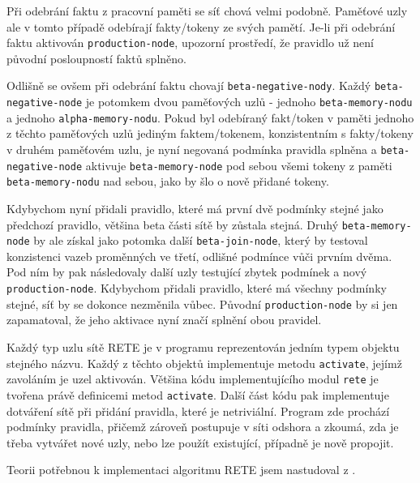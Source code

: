 Při odebrání faktu z pracovní paměti se síť chová velmi podobně. Paměťové uzly
ale v tomto případě odebírají fakty/tokeny ze svých pamětí.
Je-li při odebrání faktu aktivován \verb|production-node|, upozorní prostředí,
že pravidlo už není původní posloupností faktů splněno.

Odlišně se ovšem při odebrání faktu chovají \verb|beta-negative-nody|. Každý
\verb|beta-negative-node| je potomkem dvou paměťových uzlů - jednoho
\verb|beta-memory-nodu| a jednoho \verb|alpha-memory-nodu|. Pokud byl odebíraný
fakt/token v paměti jednoho z těchto paměťových uzlů jediným faktem/tokenem,
konzistentním s fakty/tokeny v druhém paměťovém uzlu, je nyní negovaná podmínka
pravidla splněna a \verb|beta-negative-node| aktivuje \verb|beta-memory-node|
pod sebou všemi tokeny z paměti \verb|beta-memory-nodu| nad sebou, jako by šlo o
nově přidané tokeny.

Kdybychom nyní přidali pravidlo, které má první dvě podmínky stejné jako
předchozí pravidlo, většina beta části sítě by zůstala stejná. Druhý
\verb|beta-memory-node| by ale získal jako potomka další \verb|beta-join-node|,
který by testoval konzistenci vazeb proměnných ve třetí, odlišné podmínce vůči
prvním dvěma. Pod ním by pak následovaly další uzly testující zbytek podmínek a
nový \verb|production-node|. Kdybychom přidali pravidlo, které má všechny
podmínky stejné, síť by se dokonce nezměnila vůbec. Původní
\verb|production-node| by si jen zapamatoval, že jeho aktivace nyní značí
splnění obou pravidel.

Každý typ uzlu sítě RETE je v programu reprezentován jedním typem objektu
stejného názvu. Každý z těchto objektů implementuje metodu \verb|activate|,
jejímž zavoláním je uzel aktivován. Většina kódu implementujícího modul
\verb|rete| je tvořena právě definicemi metod \verb|activate|. Další část kódu
pak implementuje dotváření sítě při přidání pravidla, které je netriviální.
Program zde prochází podmínky pravidla, přičemž zároveň postupuje v síti odshora
a zkoumá, zda je třeba vytvářet nové uzly, nebo lze použít existující, případně
je nově propojit.

Teorii potřebnou k implementaci algoritmu RETE jsem nastudoval z \cite{doorenbos}.
